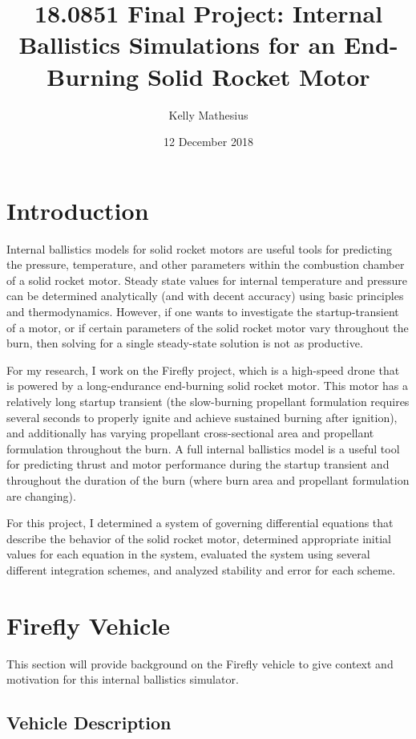 \documentclass[12pt, letterpaper]{article}
\title{18.0851 Final Project: Internal Ballistics Simulations for an End-Burning Solid Rocket Motor}
\author{Kelly Mathesius}
\date{12 December 2018}
\begin{document}
 
\maketitle
 
\section{Introduction}

Internal ballistics models for solid rocket motors are useful tools for predicting the pressure, temperature, and other parameters within the combustion chamber of a solid rocket motor. Steady state values for internal temperature and pressure can be determined analytically (and with decent accuracy) using basic principles and thermodynamics. However, if one wants to investigate the startup-transient of a motor, or if certain parameters of the solid rocket motor vary throughout the burn, then solving for a single steady-state solution is not as productive.

For my research, I work on the Firefly project, which is a high-speed drone that is powered by a long-endurance end-burning solid rocket motor. This motor has a relatively long startup transient (the slow-burning propellant formulation requires several seconds to properly ignite and achieve sustained burning after ignition), and additionally has varying propellant cross-sectional area and propellant formulation throughout the burn. A full internal ballistics model is a useful tool for predicting thrust and motor performance during the startup transient and throughout the duration of the burn (where burn area and propellant formulation are changing). 

For this project, I determined a system of governing differential equations that describe the behavior of the solid rocket motor, determined appropriate initial values for each equation in the system, evaluated the system using several different integration schemes, and analyzed stability and error for each scheme.

\section{Firefly Vehicle}

This section will provide background on the Firefly vehicle to give context and motivation for this internal ballistics simulator.


\subsection{Vehicle Description}
\end{document}

